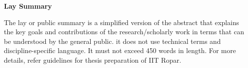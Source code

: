 




\begin{center}
{\LARGE \textbf{Lay Summary}}
\end{center}


The lay or public summary is a simplified version of the abstract that explains the key goals and contributions of the research/scholarly work in terms that can be understood by the general public. it does not use technical terms and discipline-specific language. It must not exceed 450 words in length. For more details, refer guidelines for thesis preparation of IIT Ropar.

\newpage